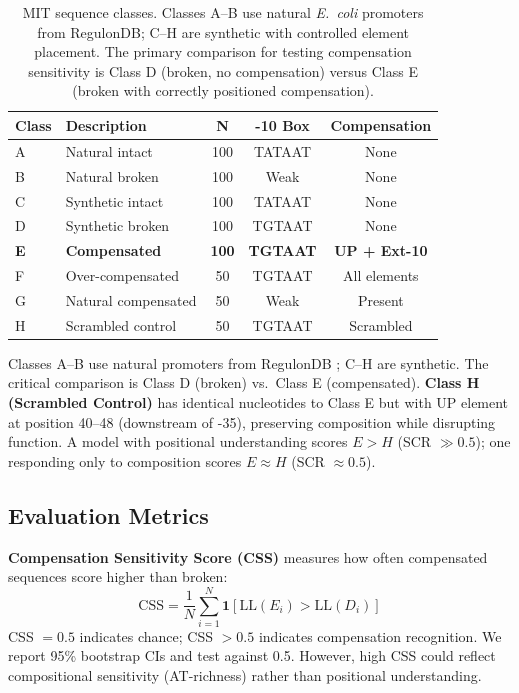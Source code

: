 \documentclass{article}
\newcommand{\css}{\text{CSS}}
\newcommand{\LL}{\text{LL}}
\begin{document}
\begin{table}[t]
\caption{MIT sequence classes. Classes A--B use natural \textit{E.\ coli} promoters from RegulonDB; C--H are synthetic with controlled element placement. The primary comparison for testing compensation sensitivity is Class D (broken, no compensation) versus Class E (broken with correctly positioned compensation).}
\label{tab:classes}
\vskip 0.1in
\begin{center}
\small
\begin{tabular}{llccc}
\toprule
Class & Description & N & -10 Box & Compensation \\
\midrule
A & Natural intact & 100 & TATAAT & None \\
B & Natural broken & 100 & Weak & None \\
C & Synthetic intact & 100 & TATAAT & None \\
D & Synthetic broken & 100 & TGTAAT & None \\
\textbf{E} & \textbf{Compensated} & \textbf{100} & \textbf{TGTAAT} & \textbf{UP + Ext-10} \\
F & Over-compensated & 50 & TGTAAT & All elements \\
G & Natural compensated & 50 & Weak & Present \\
H & Scrambled control & 50 & TGTAAT & Scrambled \\
\bottomrule
\end{tabular}
\end{center}
\vskip -0.1in
\end{table}

Classes A--B use natural promoters from RegulonDB \citep{tierrafria2022regulondb}; C--H are synthetic. The critical comparison is Class D (broken) vs.\ Class E (compensated). \textbf{Class H (Scrambled Control)} has identical nucleotides to Class E but with UP element at position 40--48 (downstream of -35), preserving composition while disrupting function. A model with positional understanding scores $E > H$ (SCR $\gg 0.5$); one responding only to composition scores $E \approx H$ (SCR $\approx 0.5$).

\subsection{Evaluation Metrics}
\label{sec:metrics}

\textbf{Compensation Sensitivity Score (CSS)} measures how often compensated sequences score higher than broken:
\begin{equation}
\css = \frac{1}{N} \sum_{i=1}^{N} \mathbf{1}[\LL(E_i) > \LL(D_i)]
\label{eq:css}
\end{equation}
CSS $= 0.5$ indicates chance; CSS $> 0.5$ indicates compensation recognition. We report 95\% bootstrap CIs and test against 0.5. However, high CSS could reflect compositional sensitivity (AT-richness) rather than positional understanding.
\end{document}
